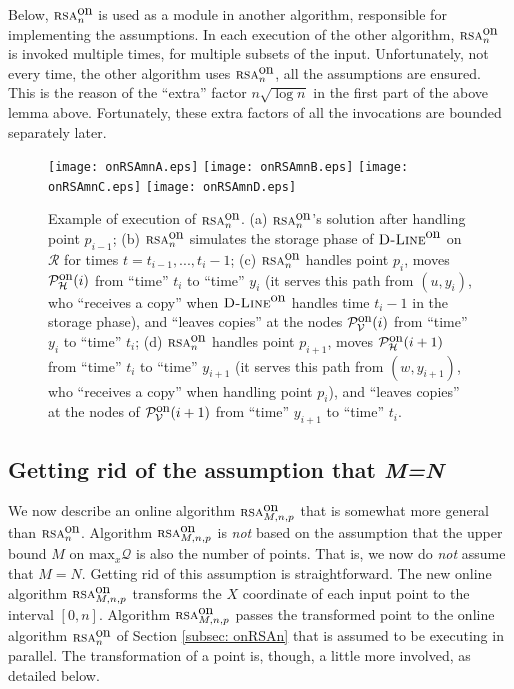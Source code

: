 \documentclass[11pt]{article}
\newcommand{\calV}{\mathcal{V}}
\newcommand{\calH}{\mathcal{H}}
\newcommand{\calR}{\mathcal{R}}
\newcommand{\calQ}{\mathcal{Q}}
\newcommand{\calP}{\mathcal{P}}
\newcommand{\onRSAmn}{\mbox{\sc rsa}^{\mbox{\upshape on}}_{\MM,\nn,p}}
\newcommand{\onRSAn}{\mbox{\sc rsa}^{\mbox{\upshape on}}_{\nn}}
\newcommand{\xmaxQ}[0]{\mbox{max}_x\calQ}
\newcommand{\MM}[0]{M}
\newcommand{\nn}{n}
\newcommand{\PHon}[0]{\calP_\calH^{\mbox{\upshape\small on}}}
\newcommand{\PVon}[0]{\calP_\calV^{\mbox{\upshape\small on}}}
\newcommand{\Dlineon}[0]{\mbox{{\sc D-Line}}^{\mbox{\upshape on}}}
\begin{document}
Below,  $\onRSAn$ is used as a module in another algorithm, responsible for implementing the assumptions.
In each execution of the other algorithm, $\onRSAn$ is invoked multiple times, for multiple subsets of the input.
Unfortunately, not every time, the other algorithm uses $\onRSAn$, all the assumptions are ensured.
This is the reason of the ``extra'' factor $n \sqrt{\log n}$ in the first part of the above lemma above.
Fortunately, these extra factors of all the invocations are bounded separately later.



\def\FigonRSAnEXE{
\begin{figure}
\begin{center}
\texttt{[image: onRSAmnA.eps]}
\hfill
\texttt{[image: onRSAmnB.eps]}
\hfill
\texttt{[image: onRSAmnC.eps]}
\hfill
\texttt{[image: onRSAmnD.eps]}
\end{center}
\caption{\sf Example of execution of $\onRSAn$.
(a) $\onRSAn$'s solution after handling point $p_{i-1}$;
(b) $\onRSAn$ simulates the storage phase of $\Dlineon$ on $\calR$ for times $t=t_{i-1},...,t_i-1$;
(c) $\onRSAn$ handles point $p_i$, moves $\PHon(i)$ from ``time'' $t_i$ to ``time'' $y_i$ (it serves this path from $(u,y_i)$, who ``receives a copy'' when $\Dlineon$ handles time $t_i-1$ in the storage phase),
and ``leaves copies'' at the nodes $\PVon(i)$ from ``time'' $y_i$ to ``time'' $t_i$;
(d) $\onRSAn$ handles point $p_{i+1}$,
 moves $\PHon(i+1)$ from ``time'' $t_i$ to ``time'' $y_{i+1}$ (it serves this path from $(w,y_{i+1})$, who ``receives a copy'' when handling point $p_i$), and
 ``leaves  copies'' at the nodes of $\PVon(i+1)$ from ``time'' $y_{i+1}$ to ``time'' $t_i$.
\label{fig: onRSAmn execution}}
\end{figure}
} \FigonRSAnEXE





\subsection{Getting rid of the assumption that {\bf\em M=N}}
\label{subsec: onRSAmn}
We now describe an online algorithm $\onRSAmn$ that is somewhat more general than $\onRSAn$. Algorithm $\onRSAmn$ is {\em not} based on the assumption that the upper bound $M$ on $\xmaxQ$ is also the number of points.
That is, we now do {\em not} assume that $M=N$. Getting rid of this assumption is straightforward.
The new online algorithm $\onRSAmn$ transforms the $X$ coordinate of each input point to the interval $[0,n]$. Algorithm $\onRSAmn$ passes the transformed point to the online algorithm $\onRSAn$ of Section \ref{subsec: onRSAn} that is assumed to be executing in parallel. The transformation of a point is, though, a little more involved, as detailed below.
\end{document}
